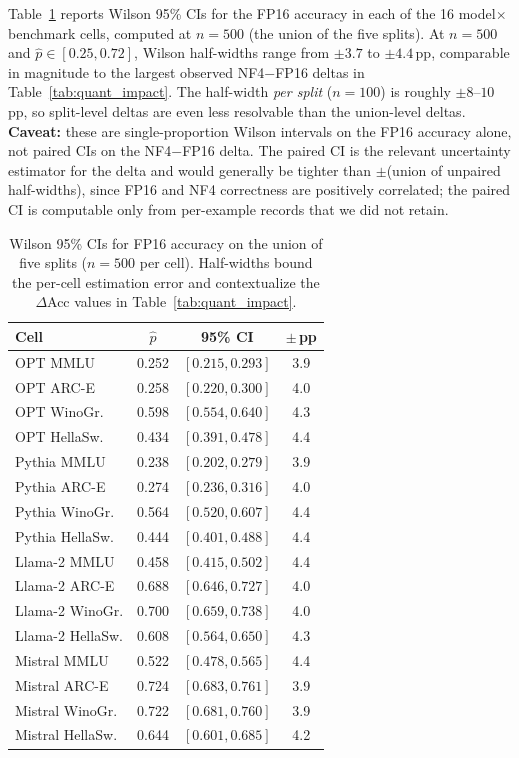 \documentclass{article}
\begin{document}
Table~\ref{tab:wilson} reports Wilson 95\% CIs \citep{wilson1927probable} for the FP16 accuracy in each of the 16 model$\times$benchmark cells, computed at $n{=}500$ (the union of the five splits). At $n{=}500$ and $\hat p \in [0.25, 0.72]$, Wilson half-widths range from $\pm 3.7$ to $\pm 4.4$\,pp, comparable in magnitude to the largest observed NF4$-$FP16 deltas in Table~\ref{tab:quant_impact}. The half-width \emph{per split} ($n{=}100$) is roughly $\pm 8$--$10$\,pp, so split-level deltas are even less resolvable than the union-level deltas. \textbf{Caveat:} these are single-proportion Wilson intervals on the FP16 accuracy alone, not paired CIs on the NF4$-$FP16 delta. The paired CI is the relevant uncertainty estimator for the delta and would generally be tighter than $\pm$(union of unpaired half-widths), since FP16 and NF4 correctness are positively correlated; the paired CI is computable only from per-example records that we did not retain.

\begin{table}[t]
\caption{Wilson 95\% CIs for FP16 accuracy on the union of five splits ($n{=}500$ per cell). Half-widths bound the per-cell estimation error and contextualize the $\Delta$Acc values in Table~\ref{tab:quant_impact}.}
\label{tab:wilson}
\centering
\small
\begin{tabular}{lccc}
\toprule
Cell & $\hat p$ & 95\% CI & $\pm$\,pp \\
\midrule
OPT MMLU       & 0.252 & $[0.215, 0.293]$ & 3.9 \\
OPT ARC-E      & 0.258 & $[0.220, 0.300]$ & 4.0 \\
OPT WinoGr.    & 0.598 & $[0.554, 0.640]$ & 4.3 \\
OPT HellaSw.   & 0.434 & $[0.391, 0.478]$ & 4.4 \\
Pythia MMLU    & 0.238 & $[0.202, 0.279]$ & 3.9 \\
Pythia ARC-E   & 0.274 & $[0.236, 0.316]$ & 4.0 \\
Pythia WinoGr. & 0.564 & $[0.520, 0.607]$ & 4.4 \\
Pythia HellaSw.& 0.444 & $[0.401, 0.488]$ & 4.4 \\
Llama-2 MMLU   & 0.458 & $[0.415, 0.502]$ & 4.4 \\
Llama-2 ARC-E  & 0.688 & $[0.646, 0.727]$ & 4.0 \\
Llama-2 WinoGr.& 0.700 & $[0.659, 0.738]$ & 4.0 \\
Llama-2 HellaSw.& 0.608 & $[0.564, 0.650]$ & 4.3 \\
Mistral MMLU   & 0.522 & $[0.478, 0.565]$ & 4.4 \\
Mistral ARC-E  & 0.724 & $[0.683, 0.761]$ & 3.9 \\
Mistral WinoGr.& 0.722 & $[0.681, 0.760]$ & 3.9 \\
Mistral HellaSw.& 0.644 & $[0.601, 0.685]$ & 4.2 \\
\bottomrule
\end{tabular}
\end{table}
\end{document}
